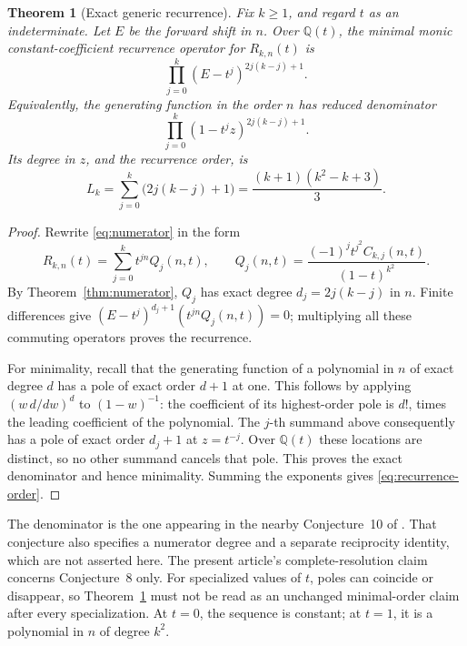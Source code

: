 \documentclass[11pt,a4paper]{article}
\newtheorem{theorem}{Theorem}[section]
\theoremstyle{definition}
\theoremstyle{remark}
\newcommand{\Q}{\mathbb Q}
\numberwithin{equation}{section}
\begin{document}
\begin{theorem}[Exact generic recurrence]
\label{thm:recurrence}
Fix \(k\ge1\), and regard \(t\) as an indeterminate. Let \(E\) be the
forward shift in \(n\). Over \(\Q(t)\), the minimal monic
constant-coefficient recurrence operator for \(R_{k,n}(t)\) is
\begin{equation}
 \prod_{j=0}^{k}(E-t^j)^{2j(k-j)+1}.
 \label{eq:recurrence}
\end{equation}
Equivalently, the generating function in the order \(n\) has reduced
denominator
\begin{equation}
 \prod_{j=0}^{k}(1-t^jz)^{2j(k-j)+1}.
 \label{eq:gf-denominator}
\end{equation}
Its degree in \(z\), and the recurrence order, is
\begin{equation}
 L_k=\sum_{j=0}^{k}\bigl(2j(k-j)+1\bigr)
     =\frac{(k+1)(k^2-k+3)}{3}.
 \label{eq:recurrence-order}
\end{equation}
\end{theorem}
\begin{proof}
Rewrite \eqref{eq:numerator} in the form
\[
 R_{k,n}(t)=\sum_{j=0}^{k}t^{jn}Q_j(n,t),\qquad
 Q_j(n,t)=\frac{(-1)^jt^{j^2}C_{k,j}(n,t)}{(1-t)^{k^2}}.
\]
By Theorem~\ref{thm:numerator}, \(Q_j\) has exact degree
\(d_j=2j(k-j)\) in \(n\). Finite differences give
\((E-t^j)^{d_j+1}(t^{jn}Q_j(n,t))=0\); multiplying all these commuting
operators proves the recurrence.

For minimality, recall that the generating function of a polynomial in
\(n\) of exact degree \(d\) has a pole of exact order \(d+1\) at one.
This follows by applying \((w\,d/dw)^d\) to \((1-w)^{-1}\): the
coefficient of its highest-order pole is \(d!\), times the leading
coefficient of the polynomial. The \(j\)-th summand above consequently
has a pole of exact order \(d_j+1\) at \(z=t^{-j}\). Over \(\Q(t)\)
these locations are distinct, so no other summand cancels that pole.
This proves the exact denominator and hence minimality. Summing the
exponents gives \eqref{eq:recurrence-order}.
\end{proof}

The denominator is the one appearing in the nearby Conjecture~10 of
\cite{cigler}. That conjecture also specifies a numerator degree and a
separate reciprocity identity, which are not asserted here. The present
article's complete-resolution claim concerns Conjecture~8 only.
For specialized values of \(t\), poles can coincide or disappear, so
Theorem~\ref{thm:recurrence} must not be read as an unchanged minimal-order
claim after every specialization. At \(t=0\), the sequence is constant;
at \(t=1\), it is a polynomial in \(n\) of degree \(k^2\).
\end{document}
